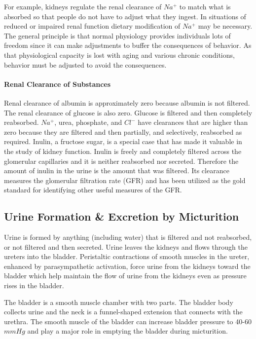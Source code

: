 For example, kidneys regulate the renal clearance of $Na^+$ to match what is absorbed so that people do not have to adjust what they ingest. In situations of reduced or impaired renal function dietary modification of $Na^+$ may be necessary. The general principle is that normal physiology provides individuals lots of freedom since it can make adjustments to buffer the consequences of behavior. As that physiological capacity is lost with aging and various chronic conditions, behavior must be adjusted to avoid the consequences. 

\paragraph{Renal Clearance of Substances}

Renal clearance of albumin is approximately zero because albumin is not filtered. The renal clearance of glucose is also zero. Glucose is filtered and then completely reabsorbed. $Na^+$, urea, phosphate, and $Cl^-$ have clearances that are higher than zero because they are filtered and then partially, and selectively, reabsorbed as required. Inulin, a fructose sugar, is a special case that has made it valuable in the study of kidney function. Inulin is freely and completely filtered across the glomerular capillaries and it is neither reabsorbed nor secreted. Therefore the amount of inulin in the urine is the amount that was filtered. Its clearance measures the glomerular filtration rate (GFR) and has been utilized as the gold standard for identifying other useful measures of the GFR.

\subsection{Urine Formation \& Excretion by Micturition}

Urine is formed by anything (including water) that is filtered and not reabsorbed, or not filtered and then secreted. Urine leaves the kidneys and flows through the ureters into the bladder. Peristaltic contractions of smooth muscles in the ureter, enhanced by parasympathetic activation, force urine from the kidneys toward the bladder which help maintain the flow of urine from the kidneys even as pressure rises in the bladder. 

The bladder is a smooth muscle chamber with two parts. The bladder body collects urine and the neck is a funnel-shaped extension that connects with the urethra. The smooth muscle of the bladder can increase bladder pressure to 40-60 $mm Hg$ and play a major role in emptying the bladder during micturition.

